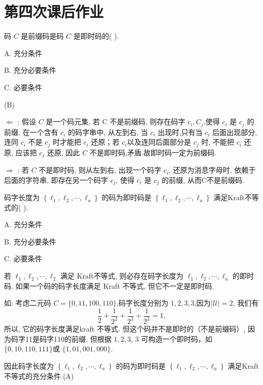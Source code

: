 
\section{第四次课后作业}

\begin{tcolorbox}[breakable,colback=blue!5!white,colframe=blue!75!black,
 title= 单选题]
 码 $ C $ 是前缀码是码 $ C $ 是即时码的( ).

A. 充分条件

B. 充分必要条件

C. 必要条件

\tcblower
(B)

$ \Leftarrow $ : 假设 $ C $ 是一个码元集, 若 $ \mathrm{C} $ 不是前缀码, 则存在码字 $ c_{i}, C_{j} $,使得 $ c_{i} $ 是 $ c_{j} $ 的前缀, 在一个含有 $ c_{i} $ 的码字串中, 从左到右, 当 $ c_{i} $ 出现时,只有当 $ c_{i} $ 后面出现部分, 连同 $ c_{i} $ 不是 $ c_{j} $ 时才能把 $ c_{i} $ 还原；若 $ c_{i} $以及连同后面部分是 $ c_{j} $ 时, 不能把 $ c_{i} $ 还原, 应该把 $ c_{j} $ 还原, 因此 $ C $ 不是即时码,矛盾.故即时码一定为前缀码.
 
$ \Rightarrow $ : 若 $ C $ 不是即时码, 则从左到右, 出现一个码字 $ c_{i} $, 还原为消息字母时, 依赖于后面的字符串, 即存在另一个码字 $ c_{j} $, 使得 $ c_{i} $ 是 $ c_{j} $ 的前缀, 从而C不是前缀码.

\end{tcolorbox}


\begin{tcolorbox}[breakable,colback=blue!5!white,colframe=blue!75!black,
 title= 单选题]
码字长度为 $ \left\{\ell_{1}, \ell_{2}, \cdots, \ell_{a}\right\} $ 的码为即时码是 $ \left\{\ell_{1}, \ell_{2}, \cdots, \ell_{a}\right\} $ 满足Kraft不等式的( ).

A. 充分条件

B. 充分必要条件

C. 必要条件

\tcblower

 若 $ \ell_{1}, \ell_{2}, \cdots, \ell_{2} $ 满足 Kraft不等式, 则必存在码字长度为 $ \ell_{1}, \ell_{2}, \cdots, \ell_{a} $ 的即时码. 如果一个码的码字长度满足 Kraft 不等式, 但它不一定是即时码.

如: 考虑二元码 $ C=\{0,11,100,110\} $,码字长度分别为 $ 1,2,3,3 $,因为$|\mathscr{U}|=2$, 我们有
$$
\frac{1}{2}+\frac{1}{2^{2}}+\frac{1}{2^{3}}+\frac{1}{2^{3}}=1,
$$
所以, 它的码字长度满足kraft 不等式.
但这个码并不是即时的（不是前缀码）, 因为码字11是码字110的前缀.
但根据 $ 1,2,3 $, 3 可构造一个即时码，如 $ \{0,10,110,111\} $或 $ \{1,01,001,000\} $.

因此码字长度为 $ \left\{\ell_{1}, \ell_{2}, \cdots, \ell_{a}\right\} $ 的码为即时码是 $ \left\{\ell_{1}, \ell_{2}, \cdots, \ell_{a}\right\} $ 满足Kraft不等式的充分条件.(A)

\end{tcolorbox}



